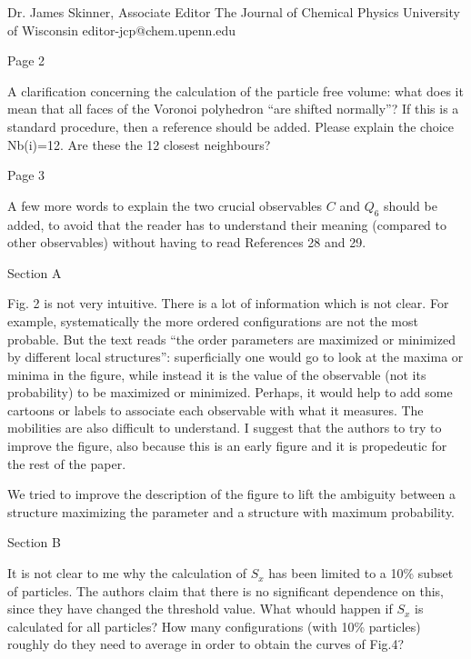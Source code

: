 \documentclass[a4paper, rebuttal, parskip=true, firsthead=false, fromemail=true, foldmarks=false]{scrlttr2}
\begin{document}
\begin{letter}{Dr. James Skinner, Associate Editor
The Journal of Chemical Physics
University of Wisconsin
editor-jcp@chem.upenn.edu }
\begin{quotationi}
Page 2

A clarification concerning the calculation of the particle free volume: what does it mean that all faces of the Voronoi polyhedron ``are shifted normally''? If this is a standard procedure, then a reference should be added.
Please explain the choice Nb(i)=12. Are these the 12 closest neighbours?
\end{quotationi}

\begin{quotationi}
Page 3

A few more words to explain the two crucial observables $C$ and $Q_6$ should be added, to avoid that the reader has to understand their meaning (compared to other observables) without having to read References 28 and 29.
\end{quotationi}

\begin{quotationi}
Section A

Fig. 2 is not very intuitive. There is a lot of information which is not clear. For example, systematically the more ordered configurations are not the most probable. But the text reads ``the order parameters are maximized or minimized by different local structures'': superficially one would go to look at the maxima or minima in the figure, while instead it is the value of the observable (not its probability) to be maximized or minimized. Perhaps, it would help to add some cartoons or labels to associate each observable with what it measures. The mobilities are also difficult to understand. I suggest that the authors to try to improve the figure, also because this is an early figure and it is propedeutic for the rest of the paper.
\end{quotationi}

We tried to improve the description of the figure to lift the ambiguity between a structure maximizing the parameter and a structure with maximum probability.

\begin{quotationi}
Section B

It is not clear to me why the calculation of $S_x$ has been limited to a 10\% subset of particles. The authors claim that there is no significant dependence on this, since they have changed the threshold value. What whould happen if $S_x$ is calculated for all particles? How many configurations (with 10\% particles) roughly do they need to average in order to obtain the curves of Fig.4?
\end{quotationi}


\end{letter}
\end{document}
